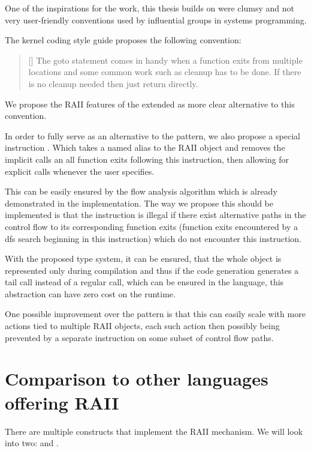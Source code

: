 One of the inspirations for the work, this thesis builds on were clumsy and not very user-friendly conventions used by influential groups in systems programming.

The kernel coding style guide proposes the following convention:

\begin{quotation}[]
  The goto statement comes in handy when a function exits from multiple locations and some common work such as cleanup has to be done. If there is no cleanup needed then just return directly.
\end{quotation}

We propose the RAII features of the extended \cmm as more clear alternative to this convention.

In order to fully serve as an alternative to the  pattern, we also propose a special instruction . Which takes a named alias to the RAII object and removes the implicit calls an all function exits following this instruction, then allowing for explicit calls whenever the user specifies.

This can be easily ensured by the flow analysis algorithm which is already demonstrated in the implementation. The way we propose this should be implemented is that the  instruction is illegal if there exist alternative paths in the control flow to its corresponding function exits (function exits encountered by a dfs search beginning in this instruction) which do not encounter this instruction.

With the proposed type system, it can be ensured, that the whole object is represented only during compilation and thus if the code generation generates a tail call instead of a regular call, which can be ensured in the \cmm language, this abstraction can have zero cost on the runtime.

One possible improvement over the  pattern is that this can easily scale with more actions tied to multiple RAII objects, each such action then possibly being prevented by a separate  instruction on some subset of control flow paths.

\section{Comparison to other languages offering RAII}

There are multiple constructs that implement the RAII mechanism. We will look into two:  and .

